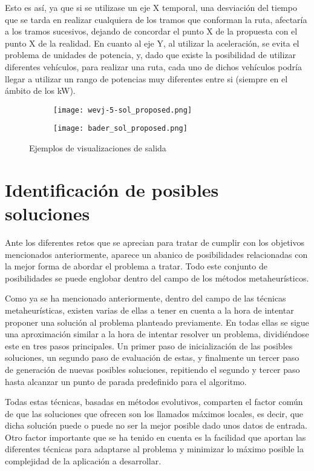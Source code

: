 \documentclass[11pt,spanish,listoffigures,listoftables]{tfgetsinf}
\begin{document}
Esto es así, ya que si se utilizase un eje X temporal, una desviación del tiempo que se tarda en realizar cualquiera de los tramos que conforman la ruta, afectaría a los tramos sucesivos, dejando de concordar el punto X de la propuesta con el punto X de la realidad. En cuanto al eje Y, al utilizar la aceleración, se evita el problema de unidades de potencia, y, dado que existe la posibilidad de utilizar diferentes vehículos, para realizar una ruta, cada uno de dichos vehículos podría llegar a utilizar un rango de potencias muy diferentes entre si (siempre en el ámbito de los kW).

\begin{figure}[!htb]
    \centering
    \begin{subfigure}[b]{0.95\linewidth}
    \texttt{[image: wevj-5-sol\_proposed.png]}
    \end{subfigure}
    \begin{subfigure}[b]{0.95\linewidth}
    \texttt{[image: bader\_sol\_proposed.png]}
    \end{subfigure}
    \caption{Ejemplos de visualizaciones de salida}
    \label{fig:other_solutions}
\end{figure}

\section{Identificación de posibles soluciones}
Ante los diferentes retos que se aprecian para tratar de cumplir con los objetivos mencionados anteriormente, aparece un abanico de posibilidades relacionadas con la mejor forma de abordar el problema a tratar. Todo este conjunto de posibilidades se puede englobar dentro del campo de los métodos metaheurísticos.

Como ya se ha mencionado anteriormente, dentro del campo de las técnicas metaheurísticas, existen varias de ellas a tener en cuenta a la hora de intentar proponer una solución al problema planteado previamente. En todas ellas se sigue una aproximación similar a la hora de intentar resolver un problema, dividiéndose este en tres pasos principales. Un primer paso de inicialización de las posibles soluciones, un segundo paso de evaluación de estas, y finalmente un tercer paso de generación de nuevas posibles soluciones, repitiendo el segundo y tercer paso hasta alcanzar un punto de parada predefinido para el algoritmo.

Todas estas técnicas, basadas en métodos evolutivos, comparten el factor común de que las soluciones que ofrecen son los llamados máximos locales, es decir, que dicha solución puede o puede no ser la mejor posible dado unos datos de entrada. Otro factor importante que se ha tenido en cuenta es la facilidad que aportan las diferentes técnicas para adaptarse al problema y minimizar lo máximo posible la complejidad de la aplicación a desarrollar.
\end{document}
